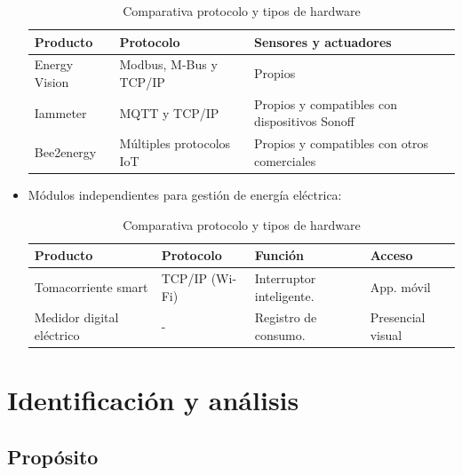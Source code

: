 \begin{itemize}
\begin{table}[h]
	\centering
	\caption[Comparativa de soluciones entre protocolo y hardware]{Comparativa protocolo y tipos de hardware}
	\begin{tabular}{l p{5cm} p{5cm}}    
		\toprule
		\textbf{Producto} 	 & \textbf{Protocolo}  & \textbf{Sensores y actuadores}  \\
		\midrule
		Energy Vision & Modbus, M-Bus  y TCP/IP 	& Propios \\		
		Iammeter	 & MQTT y TCP/IP	& Propios y compatibles con       dispositivos Sonoff   \\
		Bee2energy	 & Múltiples protocolos IoT		& Propios y compatibles con otros comerciales  \\
		\bottomrule
		\hline
	\end{tabular}
	\label{tab:tabla3}
\end{table}

\vspace{1cm}
\item Módulos independientes para gestión de energía eléctrica:


\begin{table}[h]
	\centering
	\caption[Comparativa de módulos entre protocolo y hardware]{Comparativa protocolo y tipos de hardware}
	\begin{tabular}{l p{2cm} p{3cm} p{2cm}}    
		\toprule
		\textbf{Producto} 	 & \textbf{Protocolo}  & \textbf{Función} & \textbf{Acceso} \\
		\midrule
		Tomacorriente smart & TCP/IP (Wi-Fi)	& Interruptor inteligente. & App. móvil  \\		
		Medidor digital eléctrico	 & -	& Registro de consumo.  & Presencial visual \\
		
		\bottomrule
		\hline
	\end{tabular}
	\label{tab:tabla4}
\end{table}

\end{itemize}

\section{Identificación y análisis}



\subsection{Propósito}

